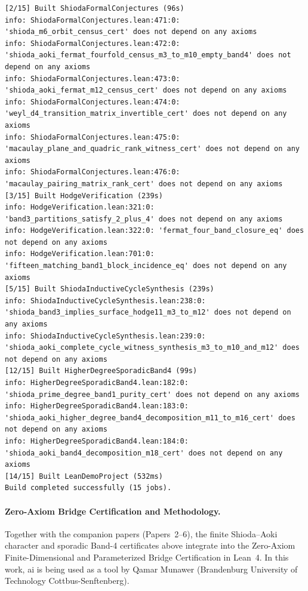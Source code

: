 \documentclass[11pt,a4paper]{article}
\begin{document}
\begin{lstlisting}[language={},basicstyle=\ttfamily\scriptsize,caption={Raw \texttt{lake clean \&\& lake build} and \texttt{\#print axioms} output for Paper~1 theorems.}]
[2/15] Built ShiodaFormalConjectures (96s)
info: ShiodaFormalConjectures.lean:471:0: 'shioda_m6_orbit_census_cert' does not depend on any axioms
info: ShiodaFormalConjectures.lean:472:0: 'shioda_aoki_fermat_fourfold_census_m3_to_m10_empty_band4' does not depend on any axioms
info: ShiodaFormalConjectures.lean:473:0: 'shioda_aoki_fermat_m12_census_cert' does not depend on any axioms
info: ShiodaFormalConjectures.lean:474:0: 'weyl_d4_transition_matrix_invertible_cert' does not depend on any axioms
info: ShiodaFormalConjectures.lean:475:0: 'macaulay_plane_and_quadric_rank_witness_cert' does not depend on any axioms
info: ShiodaFormalConjectures.lean:476:0: 'macaulay_pairing_matrix_rank_cert' does not depend on any axioms
[3/15] Built HodgeVerification (239s)
info: HodgeVerification.lean:321:0: 'band3_partitions_satisfy_2_plus_4' does not depend on any axioms
info: HodgeVerification.lean:322:0: 'fermat_four_band_closure_eq' does not depend on any axioms
info: HodgeVerification.lean:701:0: 'fifteen_matching_band1_block_incidence_eq' does not depend on any axioms
[5/15] Built ShiodaInductiveCycleSynthesis (239s)
info: ShiodaInductiveCycleSynthesis.lean:238:0: 'shioda_band3_implies_surface_hodge11_m3_to_m12' does not depend on any axioms
info: ShiodaInductiveCycleSynthesis.lean:239:0: 'shioda_aoki_complete_cycle_witness_synthesis_m3_to_m10_and_m12' does not depend on any axioms
[12/15] Built HigherDegreeSporadicBand4 (99s)
info: HigherDegreeSporadicBand4.lean:182:0: 'shioda_prime_degree_band1_purity_cert' does not depend on any axioms
info: HigherDegreeSporadicBand4.lean:183:0: 'shioda_aoki_higher_degree_band4_decomposition_m11_to_m16_cert' does not depend on any axioms
info: HigherDegreeSporadicBand4.lean:184:0: 'shioda_aoki_band4_decomposition_m18_cert' does not depend on any axioms
[14/15] Built LeanDemoProject (532ms)
Build completed successfully (15 jobs).
\end{lstlisting}

\paragraph*{Zero-Axiom Bridge Certification and Methodology.}
Together with the companion papers (Papers~2--6), the finite Shioda--Aoki character and sporadic Band-4 certificates above integrate into the Zero-Axiom Finite-Dimensional and Parameterized Bridge Certification in Lean~4. In this work, ai is being used as a tool by Qamar Munawer (Brandenburg University of Technology Cottbus-Senftenberg).
\end{document}
